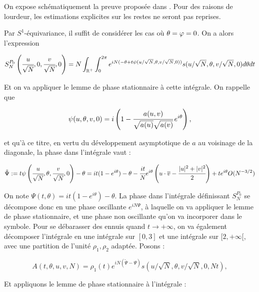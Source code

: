 \begin{preuve}
	On expose schématiquement la preuve proposée dans \cite{Shiffman2002}. Pour des raisons de lourdeur, les estimations explicites sur les restes ne seront pas reprises.
	
	Par $S^1$-équivariance, il suffit de considérer les cas où $\theta = \varphi = 0$. On a alors l'expression 
	
	\begin{equation*}
	S_N^{P_0}\left(\cfrac{u}{\sqrt{N}},0,\cfrac{v}{\sqrt{N}},0\right) = N \int_{\mathbb{R}^+}\int_0^{2\pi}e^{iN(-\theta + t\psi(u/\sqrt{N},\theta,v/\sqrt{N},0))}s(u/\sqrt{N},\theta, v/\sqrt{N},0)d\theta dt
	\end{equation*}
	
	Et on va appliquer le lemme de phase stationnaire à cette intégrale. On rappelle que 
	
	\begin{equation*}
	\psi(u,\theta,v,0) = i\left(1-\cfrac{a(u,v)}{\sqrt{a(u)}\sqrt{a(v)}}\,e^{i\theta}\right),
	\end{equation*}
	
	et qu'à ce titre, en vertu du développement asymptotique de $a$ au voisinage de la diagonale, la phase dans l'intégrale vaut :
	
	\begin{equation*}
	\tilde{\Psi} := t\psi\left(\cfrac{u}{\sqrt{N}},\theta,\cfrac{v}{\sqrt{N}},0\right) -\theta= it(1-e^{i\theta}) - \theta - \cfrac{it}{N}e^{i\theta}\left(u\cdot\overline{v} - \cfrac {|u|^2+|v|^2}{2}\right) + t e^{i\theta}O(N^{-3/2})
	\end{equation*}
	
	On note $\Psi(t,\theta) = it(1-e^{i\theta})-\theta$. La phase dans l'intégrale définissant $S_N^{P_0}$ se décompose donc en une phase oscillante $e^{iN\Psi}$, à laquelle on va appliquer le lemme de phase stationnaire, et une phase non oscillante qu'on va incorporer dans le symbole. Pour se débarasser des ennuis quand $t \to +\infty$, on va également décomposer l'intégrale en une intégrale sur $[0,3]$ et une intégrale sur $[2,+\infty[$, avec une partition de l'unité $\rho_1,\rho_2$ adaptée. Posons :
	
	\begin{equation*}
		A(t,\theta, u,v,N) = \rho_1(t)e^{iN(\tilde{\Psi}-\Psi)}s(u/\sqrt{N}, \theta, v/\sqrt{N},0, Nt),
	\end{equation*} 
	
	Et appliquons le lemme de phase stationnaire à l'intégrale :
	

\end{preuve}
